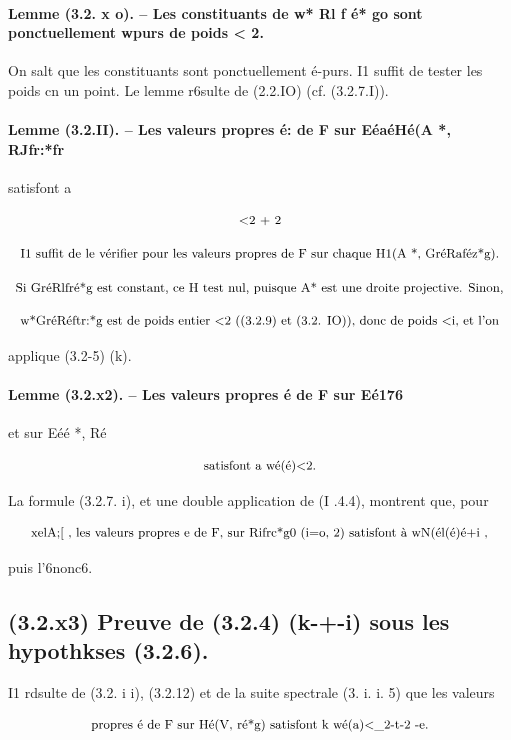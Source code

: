\documentclass[11pt]{article}
\theoremstyle{remark}
\begin{document}
\paragraph{Lemme (3.2. x o). -- Les constituants de w* Rl f é* go sont ponctuellement wpurs de poids < 2.}

On salt que les constituants sont ponctuellement é-purs. I1 suffit de tester les poids cn un point. Le lemme r6sulte de (2.2.IO) (cf. (3.2.7.I)).

\paragraph{Lemme (3.2.II). -- Les valeurs propres é: de F sur EéaéHé(A *, RJfr:*fr}

satisfont a

\[\text{\small <2 + 2}\]

\[\text{\small I1 suffit de le vérifier pour les valeurs propres de F sur chaque H1(A *, GréRaféz*g).}\]

\[\text{\small Si GréRlfré*g est constant, ce H test nul, puisque A* est une droite projective. Sinon,}\]

\[\text{\small w*GréRéftr:*g est de poids entier <2 ((3.2.9) et (3.2. IO)), donc de poids <i, et l'on}\]

applique (3.2-5) (k).

\paragraph{Lemme (3.2.x2). -- Les valeurs propres é de F sur Eé176}

et sur Eéé *, Ré

\[\text{\small satisfont a wé(é)<2.}\]

La formule (3.2.7. i), et une double application de (I .4.4), montrent que, pour

\[\text{\small xelA;[ , les valeurs propres e de F, sur Rifrc*g0 (i=o, 2) satisfont à wN(él(é)é+i ,}\]

puis l'6nonc6.

\subsection*{(3.2.x3) Preuve de (3.2.4) (k-+-i) sous les hypothkses (3.2.6).}

I1 rdsulte de (3.2. i i), (3.2.12) et de la suite spectrale (3. i. i. 5) que les valeurs

\[\text{\small propres é de F sur Hé(V, ré*g) satisfont k wé(a)<\_2-t-2 -e.}\]
\end{document}
